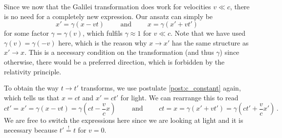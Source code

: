 \documentclass[../relativity_main.tex]{subfiles}
\begin{document}
Since we now that the Galilei transformation does work for velocities $v \ll c$, there is no need for a completely new expression. Our ansatz can simply be
\begin{equation}\label{eq:lorentz_spatial_ansatz}
	x' = \gamma (x - vt)
	\qquad \text{ and } \qquad
	x = \gamma (x' + vt')
\end{equation}
for some factor $\gamma = \gamma(v)$, which fulfils $\gamma \approx 1$ for $v \ll c$. Note that we have used $\gamma(v) = \gamma(-v)$ here, which is the reason why $x \rightarrow x'$ has the same structure as $x' \rightarrow x$. This is a necessary condition on the transformation (and thus $\gamma$) since otherwise, there would be a preferred direction, which is forbidden by the relativity principle.

To obtain the way $t \rightarrow t'$ transforms, we use postulate \ref{post:c_constant} again, which tells us that $x = ct$ and $x' = ct'$ for light. We can rearrange this to read
\begin{equation}\label{eq:lorentz_time_ansatz}
	ct' = x' = \gamma (x - vt) = \gamma (ct - \frac{v}{c} x)
	\qquad \text{ and } \qquad
	ct = x = \gamma (x' + vt') = \gamma (ct' + \frac{v}{c} x') \, .
\end{equation}
We are free to switch the expressions here since we are looking at light and it is necessary because $t' \overset{!}{=} t$ for $v = 0$.
\end{document}
